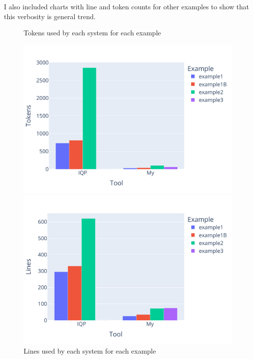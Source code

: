 \documentclass[12pt]{report}
\begin{document}
\par
I also included charts with line and token counts for other examples to show that this verbosity is general trend.
\begin{figure}[H]
\begin{minipage}{.45\textwidth}
    \caption{Tokens used by each system for each example}
    \includegraphics[width=\textwidth]{charts/all_tokens.pdf}
    \centering
\end{minipage}%
\hspace{0.5cm}
\begin{minipage}{.45\textwidth}
    \caption{Lines used by each system for each example}
    \includegraphics[width=\textwidth]{charts/all_lines.pdf}
    \centering
\end{minipage}
\end{figure}
\end{document}
